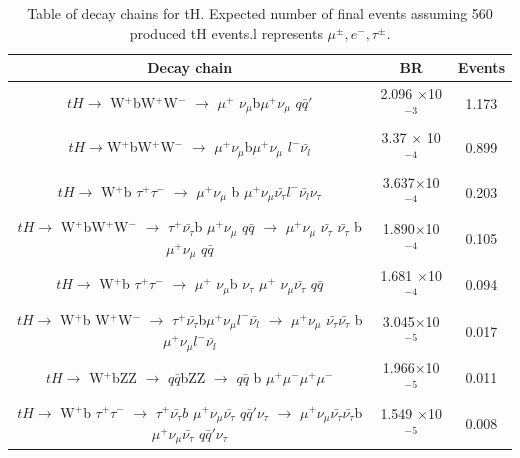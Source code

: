 \begin{linenumbers}
\begin{table}
\caption{Table of decay chains for tH.  Expected number of final events assuming 560 produced tH events.l represents $\mu^{\pm},e^- , \tau^\pm$.}
\renewcommand{\arraystretch}{0.55}
\begin{tabular}{|c|c|c|}
\hline
Decay chain & BR & Events\\
\hline 
\small{$tH \rightarrow$ W$^+$bW$^+$W$^-$ $\rightarrow$ $\mu^+$ $\nu_\mu$b$\mu^+\nu_\mu$  $q \bar{q}'$ } &\small{2.096 $\times$10$^{-3}$} &  1.173  \\
\hline
\small{$tH \rightarrow $W$^+$bW$^+$W$^-$ $\rightarrow$ $\mu^+\nu_\mu$b$\mu^+\nu_\mu$ $l^- \bar{\nu_l}$ } &\small{3.37 $\times$ 10$^{-4}$} &0.899 \\
\hline
\small{$tH \rightarrow$ W$^+$b $\tau^+ \tau^-$ $\rightarrow$ $\mu^+ \nu_\mu$ b $ \mu^+ \nu_\mu \bar{\nu_\tau} l^-\bar{\nu_l} \nu_\tau$} &\small{3.637$\times$10$^{-4}$}&0.203 \\
\hline
\small{$tH \rightarrow$ W$^+$bW$^+$W$^-$ $\rightarrow$ $\tau^+ \bar{\nu_\tau}$b $\mu^+ \nu_\mu$  $q\bar{q}$ $\rightarrow$ $\mu^+ \nu_\mu$ $\bar{\nu_\tau}$ $\bar{\nu_\tau}$ b$\mu^+ \nu_\mu$  $q \bar{q}$} &\small{1.890$\times$10$^{-4}$}&0.105  \\
\hline
\small{$tH \rightarrow$ W$^+$b $\tau^+ \tau^-$ $\rightarrow$ $\mu^+$ $\nu_\mu$b $\nu_\tau$ $\mu^+$ $\nu_\mu \bar{\nu_\tau}$} $q \bar{q}$  &
\small{1.681 $\times$10$^{-4}$} & 0.094 \\
\hline
\small{$tH \rightarrow$ W$^+$b W$^+$W$^-$ $\rightarrow$ $\tau^+ \bar{\nu_\tau}$b$ \mu^+ \nu_\mu l^- \bar{\nu_l}$ $\rightarrow$ $\mu^+\nu_\mu$ $ \bar{\nu_\tau} \bar{\nu_\tau}$  b$ \mu^+ \nu_\mu l^- \bar{\nu_l}$} &\small{3.045$\times$10$^{-5}$}& 0.017\\
\hline
\small{$tH \rightarrow$ W$^+$bZZ $\rightarrow$ $q \bar{q}$bZZ $\rightarrow$ $q \bar{q} $ b $\mu^+ \mu^- \mu^+ \mu^-$} & \small{1.966$\times$10$^{-5}$} &0.011\\
\hline 
\small{$tH \rightarrow$ W$^+$b $\tau^+ \tau^-$ $\rightarrow$ $\tau^+ \bar{\nu_\tau}b$ $\mu^+ \nu_\mu \bar{\nu_\tau} $  $q\bar{q}' \nu_\tau$ $\rightarrow$  $\mu^+ \nu_\mu \bar{\nu_\tau}\bar{\nu_\tau} $b $\mu^+ \nu_\mu \bar{\nu_\tau} $  $q\bar{q}' \nu_\tau$ } &\small{1.549 $\times$10$^{-5}$} &  0.008  \\
\hline
\end{tabular}
\end{table}

\end{linenumbers}
